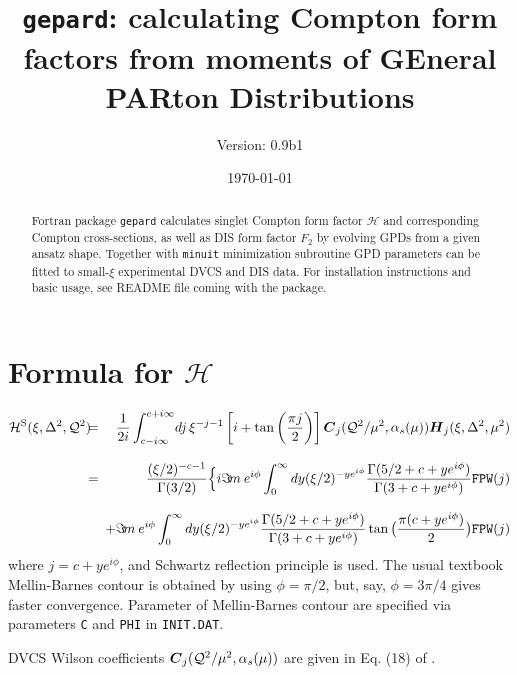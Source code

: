 \documentclass[12pt]{article}
\begin{document}
\title{\texttt{gepard}: calculating Compton form factors from moments of GEneral PARton Distributions } 
\author{Version: 0.9b1}
\date{\today}
\maketitle

\begin{abstract}
Fortran package \texttt{gepard} calculates singlet Compton form factor
$\mathcal{H}$ and corresponding Compton cross-sections, as well as
DIS form factor $F_2$ by evolving GPDs from a given ansatz shape.  Together
with \texttt{minuit} minimization subroutine GPD parameters can be fitted to
small-$\xi$ experimental DVCS and DIS data. For installation instructions and
basic usage, see README file coming with the package.
\end{abstract}

\section{Formula for $\mathcal{H}$}  

\begin{eqnarray*}
{{\cal H}^{\rm S}}(\xi,\Delta^2,{\cal Q}^2)
&\!\!\!=\!\!\!& \frac{1}{2i}\int_{c-i \infty}^{c+ i \infty}\!
dj\,\xi^{-j-1} \left[i + \tan \left(\frac{\pi j}{2}\right) \right]
\mbox{\boldmath $C$}_{j}({\cal Q}^2/\mu^2,\alpha_s(\mu)) 
\mbox{\boldmath $H$}_{j} (\xi,\Delta^2,\mu^2) \\[2ex]
&\!\!\!=\!\!\!& \frac{(\xi/2)^{-c-1}}{\Gamma(3/2)}\Big\{i \Im\! m\: e^{i\phi} 
\int_{0}^{\infty} dy  (\xi/2)^{- y e^{i\phi}} 
\frac{\Gamma(5/2 + c + y e^{i\phi})}{\Gamma(3 + c + y e^{i\phi})}
\texttt{FPW}(j) \\[2ex]
& & + \Im\! m\:  e^{i\phi} 
\int_{0}^{\infty} dy  (\xi/2)^{- y e^{i\phi}}
\frac{\Gamma(5/2 + c + y e^{i\phi})}{\Gamma(3 + c + y e^{i\phi})}
\tan\big(\frac{\pi(c + y e^{i\phi})}{2}\big)
\texttt{FPW}(j)
\label{<Hformula>}
\end{eqnarray*} 
where $j=c+ye^{i\phi}$, and Schwartz reflection principle is
used.
The usual textbook Mellin-Barnes contour is obtained by
using $\phi = \pi/2$, but, say, $\phi = 3\pi /4$ gives faster
convergence. Parameter of Mellin-Barnes contour are specified
via parameters \texttt{C} and \texttt{PHI} in \texttt{INIT.DAT}.

DVCS Wilson coefficients $\mbox{\boldmath $C$}_{j}({\cal Q}^2/\mu^2,\alpha_s(\mu))$
are given in Eq. (18) of \cite{Kumericki:2006xx}. 
\end{document}

